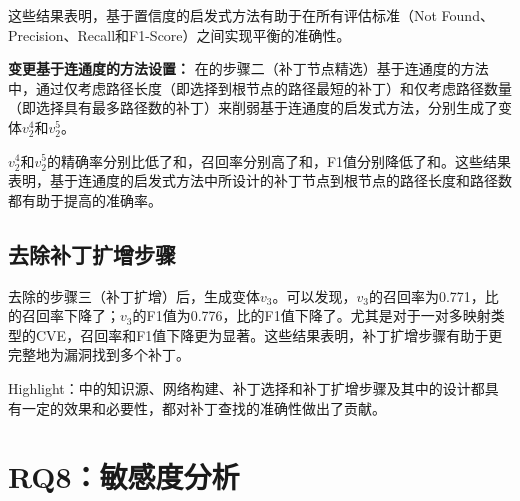 这些结果表明，基于置信度的启发式方法有助于在所有评估标准（Not Found、Precision、Recall和F1-Score）之间实现平衡的准确性。

\textbf{变更基于连通度的方法设置：}
在\tool 的步骤二（补丁节点精选）基于连通度的方法中，通过仅考虑路径长度（即选择到根节点的路径最短的补丁）和仅考虑路径数量（即选择具有最多路径数的补丁）来削弱基于连通度的启发式方法，分别生成了变体$v_2^4$和$v_2^5$。

$v_2^4$和$v_2^5$的精确率分别比\tool 低了和，召回率分别高了和，F1值分别降低了和。这些结果表明，基于连通度的启发式方法中所设计的补丁节点到根节点的路径长度和路径数都有助于提高\tool 的准确率。

\subsection{去除补丁扩增步骤}
去除\tool 的步骤三（补丁扩增）后，生成变体$v_3$。可以发现，$v_3$的召回率为0.771，比\tool 的召回率下降了；$v_3$的F1值为0.776，比\tool 的F1值下降了。尤其是对于一对多映射类型的CVE，召回率和F1值下降更为显著。这些结果表明，补丁扩增步骤有助于\tool 更完整地为漏洞找到多个补丁。

\begin{tcolorbox}[size=title,opacityfill=0.15]
Highlight：\tool 中的知识源、网络构建、补丁选择和补丁扩增步骤及其中的设计都具有一定的效果和必要性，都对\tool  补丁查找的准确性做出了贡献。
\end{tcolorbox}

\section{RQ8：敏感度分析}\label{sec:sensitivity}

